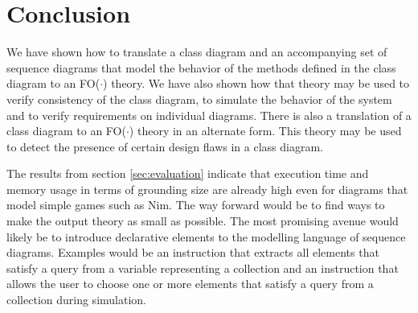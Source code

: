 \documentclass[conference]{IEEEtran}
\begin{document}




\section{Conclusion}\label{sec:conclusion}
We have shown how to translate a class diagram and an accompanying set of sequence diagrams that model the behavior of the methods defined in the class diagram to an FO($\cdot$) theory. We have also shown how that theory may be used to verify consistency of the class diagram, to simulate the behavior of the system and to verify requirements on individual diagrams. There is also a translation of a class diagram to an FO($\cdot$) theory in an alternate form. This theory may be used to detect the presence of certain design flaws in a class diagram.

The results from section \ref{sec:evaluation} indicate that execution time and memory usage in terms of grounding size are already high even for diagrams that model simple games such as Nim. The way forward would be to find ways to make the output theory as small as possible. The most promising avenue would likely be to introduce declarative elements to the modelling language of sequence diagrams. Examples would be an instruction that extracts all elements that satisfy a query from a variable representing a collection and an instruction that allows the user to choose one or more elements that satisfy a query from a collection during simulation.




%
%





\end{document}
